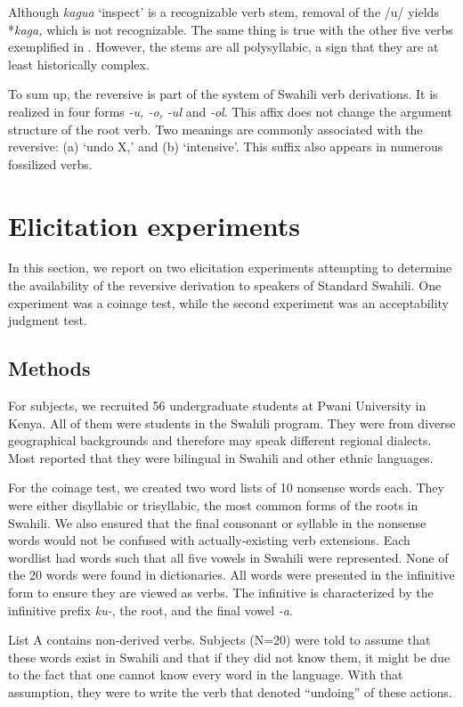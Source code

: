 \documentclass[output=paper]{langsci/langscibook}
\begin{document}
Although \textit{kagua} ‘inspect’ is a recognizable verb stem, removal of the /u/ yields *\textit{kaga,} which is not recognizable. The same thing is true with the other five verbs exemplified in . However, the stems are all polysyllabic, a sign that they are at least historically complex.

To sum up, the reversive is part of the system of Swahili verb derivations. It is realized in four forms \textit{-u, -o, -ul} and \textit{-ol}. This affix does not change the argument structure of the root verb. Two meanings are commonly associated with the reversive: (a) ‘undo X,’ and (b) ‘intensive’. This suffix also appears in numerous fossilized verbs.

\section{Elicitation experiments}\label{sec:ngonyaningowa:4}

In this section, we report on two elicitation experiments attempting to determine the availability of the reversive derivation to speakers of Standard Swahili. One experiment was a coinage test, while the second experiment was an acceptability judgment test. 

\subsection{Methods}\label{sec:ngonyaningowa:4.1}

For subjects, we recruited 56 undergraduate students at Pwani University in Kenya. All of them were students in the Swahili program. They were from diverse geographical backgrounds and therefore may speak different regional dialects. Most reported that they were bilingual in Swahili and other ethnic languages. 

For the coinage test, we created two word lists of 10 nonsense words each. They were either disyllabic or trisyllabic, the most common forms of the roots in Swahili. We also ensured that the final consonant or syllable in the nonsense words would not be confused with actually-existing verb extensions. Each wordlist had words such that all five vowels in Swahili were represented.  None of the 20 words were found in dictionaries. All words were presented in the infinitive form to ensure they are viewed as verbs. The infinitive is characterized by the infinitive prefix \textit{ku-}, the root, and the final vowel \textit{-a}.

List A  contains non-derived verbs. Subjects (N=20) were told to assume that these words exist in Swahili and that if they did not know them, it might be due to the fact that one cannot know every word in the language. With that assumption, they were to write the verb that denoted “undoing” of these actions. 
\end{document}
